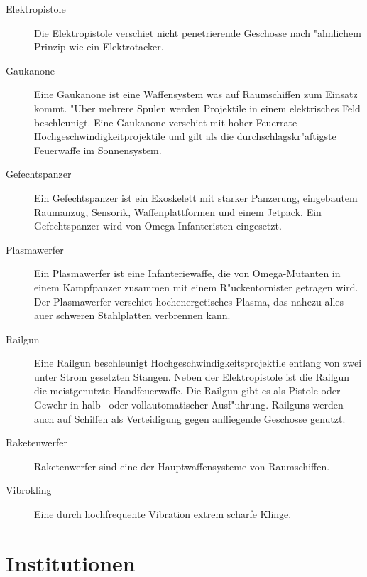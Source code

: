 \begin{appendices}
\begin{description}
\item [Elektropistole] Die Elektropistole verschie\3t nicht penetrierende Geschosse nach "ahnlichem Prinzip wie ein
      Elektrotacker.
\item [Gau\3kanone] Eine Gau\3kanone ist eine Waffensystem was auf Raumschiffen zum Einsatz kommt. "Uber mehrere Spulen
      werden Projektile in einem elektrisches Feld beschleunigt. Eine Gau\3kanone verschie\3t mit hoher Feuerrate Hochgeschwindigkeitprojektile und gilt als die durchschlagskr"aftigste Feuerwaffe im Sonnensystem.
\item [Gefechtspanzer] Ein Gefechtspanzer ist ein Exoskelett mit starker Panzerung, eingebautem Raumanzug, Sensorik,
      Waffenplattformen und einem Jetpack. Ein Gefechtspanzer wird von Omega-Infanteristen eingesetzt.
\item [Plasmawerfer] Ein Plasmawerfer ist eine Infanteriewaffe, die von Omega-Mutanten in einem Kampfpanzer zusammen mit
      einem R"uckentornister getragen wird. Der Plasmawerfer verschie\3t hochenergetisches Plasma, das nahezu alles au\3er schweren Stahlplatten verbrennen kann.
\item [Railgun] Eine Railgun beschleunigt Hochgeschwindigkeitsprojektile entlang von zwei unter Strom gesetzten Stangen.
      Neben der Elektropistole ist die Railgun die meistgenutzte Handfeuerwaffe. Die Railgun gibt es als Pistole oder Gewehr in halb-- oder vollautomatischer Ausf"uhrung. Railguns werden auch auf Schiffen als Verteidigung gegen anfliegende Geschosse genutzt.
\item [Raketenwerfer] Raketenwerfer sind eine der Hauptwaffensysteme von Raumschiffen.
\item [Vibrokling] Eine durch hochfrequente Vibration extrem scharfe Klinge.
\end{description}

\section{Institutionen}


\end{appendices}

